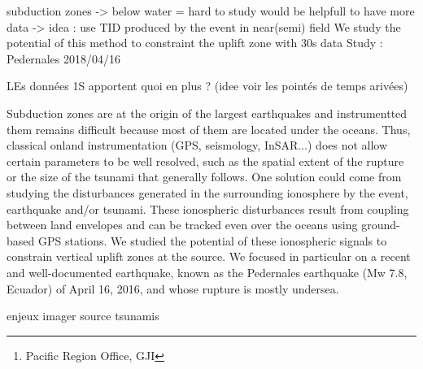 \documentclass{gji}
\title[Localization of the maximum acoustic coupling zone]
  {}
\author[F. Zedek L. Rolland et al.]
  {F. Zedek$^1$\thanks{Pacific Region Office, GJI}, L. Rolland$^1$ et al. \\
Affiliation Geoazur
  }
\date{Received ; in original form }
\begin{document}

\label{firstpage}

\maketitle


\begin{summary}
  subduction zones -> below water = hard to study
     would be helpfull to have more data
            -> idea : use TID produced by the event in near(semi) field 
    We study the potential of this method to constraint the uplift zone with 30s data 
    Study : Pedernales 2018/04/16 

LEs données 1S apportent quoi en plus ? (idee voir les pointés de temps arivées)

Subduction zones are at the origin of the largest earthquakes and instrumentted them remains difficult because most of them are located under the oceans. Thus, classical onland instrumentation (GPS, seismology, InSAR...) does not allow certain parameters to be well resolved, such as the spatial extent of the rupture or the size of the tsunami that generally follows. One solution could come from studying the disturbances generated in the surrounding ionosphere by the event, earthquake and/or tsunami. These ionospheric disturbances result from coupling between land envelopes and can be tracked even over the oceans using ground-based GPS stations. We studied the potential of these ionospheric signals to constrain vertical uplift zones at the source. We focused in particular on a recent and well-documented earthquake, known as the Pedernales earthquake (Mw 7.8, Ecuador) of April 16, 2016, and whose rupture is mostly undersea.

enjeux imager source tsunamis


\end{summary}
\end{document}
